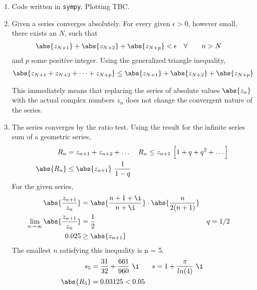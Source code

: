 \begin{enumerate}
    \item Code written in \texttt{sympy}. Plotting TBC.

    \item Given a series converges absolutely. For every given $ \epsilon > 0 $,
          however small, there exists an $ N $, such that
          \begin{align}
              \abs{z_{N+1}} + \abs{z_{N+2}} + \abs{z_{N+p}} & < \epsilon &
              \forall \qquad n                              & > N
          \end{align}
          and $ p $ some positive integer. Using the generalized triangle inequality,
          \begin{align}
              \abs{z_{N+1} + z_{N+2} + \dots + z_{N+p}} & \leq
              \abs{z_{N+1}} + \abs{z_{N+2}} + \abs{z_{N+p}}
          \end{align}

          This immediately means that replacing the series of absolute values
          $ \abs{z_n} $ with the actual complex numbers $ z_n $ does not change the
          convergent nature of the series.

    \item The series converges by the ratio test. Using the result for the infinite
          series sum of a geometric series,
          \begin{align}
              R_n       & = z_{n+1} + z_{n+2} + \dots                   &
              R_n       & \leq z_{n+1}\ \Big[ 1 + q + q^2 + \dots \Big]   \\
              \abs{R_n} & \leq \abs{z_{n+1}}\ \frac{1}{1-q}
          \end{align}
          For the given series,
          \begin{align}
              \abs{\frac{z_{n+1}}{z_n}} & = \abs{\frac{n+1 + \i}{n+\i}}
              \cdot \abs{\frac{n}{2(n+1)}}                                \\
              \lim_{n \to \infty}
              \abs{\frac{z_{n+1}}{z_n}} & = \frac{1}{2}                 &
              q                         & = 1/2                           \\
              0.025                     & \geq \abs{z_{n+1}}
          \end{align}
          The smallest $ n $ satisfying this inequality is n = 5.
          \begin{align}
              s_5       & = \frac{31}{32} + \frac{661}{960}\ \i &
              s         & = 1 + \frac{\pi}{ln(4)}\ \i             \\
              \abs{R_5} & = 0.03125 < 0.05
          \end{align}

\end{enumerate}